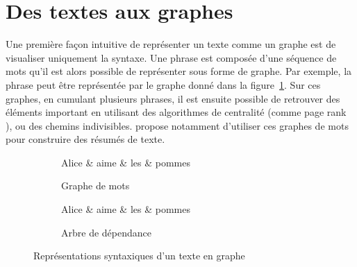 \section{Des textes aux graphes}
\label{sec:struct:related-works}

Une première façon intuitive de représenter un texte comme un graphe est de visualiser uniquement la syntaxe.
Une phrase est composée d'une séquence de mots qu'il est alors possible de représenter sous forme de graphe.
Par exemple, la phrase  peut être représentée par le graphe donné dans la figure~\ref{fig:struct:word-graph}.
Sur ces graphes, en cumulant plusieurs phrases, il est ensuite possible de retrouver des éléments important en utilisant des algorithmes de centralité (comme page rank \cite{pagePageRankCitationRanking1999}), ou des chemins indivisibles.
\cite{ganesanOpinosisGraphBased2010} propose notamment d'utiliser ces graphes de mots pour construire des résumés de texte.

\begin{figure}[htb]
    \begin{subfigure}{.45\textwidth}
        \centering
        \footnotesize
        \begin{adjustbox}{width=.7\linewidth}
            \begin{dependency}[theme=simple, hide label, column sep=4em]
                \begin{deptext}
                    Alice \& aime \& les \& pommes \\
                \end{deptext}
            \end{dependency}
        \end{adjustbox}
        \caption{Graphe de mots}
        \label{fig:struct:word-graph}
    \end{subfigure}
    \hfill
    \begin{subfigure}{.45\textwidth}
        \centering
        \footnotesize
        \begin{adjustbox}{width=.7\linewidth}
            \begin{dependency}[theme=simple, column sep=4em]
                \begin{deptext}
                    Alice \& aime \& les \& pommes \\
                \end{deptext}
            \end{dependency}
        \end{adjustbox}
        \caption{Arbre de dépendance}
        \label{fig:struct:dep-graph}
    \end{subfigure}
    \caption{Représentations syntaxiques d'un texte en graphe}
\end{figure}

